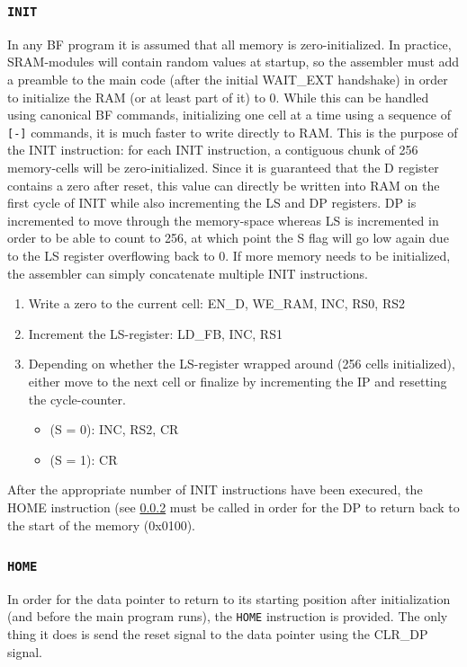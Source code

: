 \subsubsection{\texttt{INIT}} \label{sec:sequences:init}
In any BF program it is assumed that all memory is zero-initialized. In practice, SRAM-modules will contain random values at startup, so the assembler must add a preamble to the main code (after the initial WAIT\_EXT handshake) in order to initialize the RAM (or at least part of it) to 0. While this can be handled using canonical BF commands, initializing one cell at a time using a sequence of \texttt{[-]} commands, it is much faster to write directly to RAM. This is the purpose of the INIT instruction: for each INIT instruction, a contiguous chunk of 256 memory-cells will be zero-initialized. Since it is guaranteed that the D register contains a zero after reset, this value can directly be written into RAM on the first cycle of INIT while also incrementing the LS and DP registers. DP is incremented to move through the memory-space whereas LS is incremented in order to be able to count to 256, at which point the S flag will go low again due to the LS register overflowing back to 0. If more memory needs to be initialized, the assembler can simply concatenate multiple INIT instructions.
\begin{enumerate}
\item Write a zero to the current cell: EN\_D, WE\_RAM, INC, RS0, RS2
\item Increment the LS-register: LD\_FB, INC, RS1
\item Depending on whether the LS-register wrapped around (256 cells initialized), either move to the next cell or finalize by incrementing the IP and resetting the cycle-counter.
  \begin{itemize}
  \item (S = 0): INC, RS2, CR
  \item (S = 1): CR
  \end{itemize}
\end{enumerate}
After the appropriate number of INIT instructions have been execured, the HOME instruction (see \ref{sec:sequences:home} must be called in order for the DP to return back to the start of the memory (0x0100).

\subsubsection{\texttt{HOME}} \label{sec:sequences:home}
In order for the data pointer to return to its starting position after initialization (and before the main program runs), the \texttt{HOME} instruction is provided. The only thing it does is send the reset signal to the data pointer using the CLR\_DP signal.

